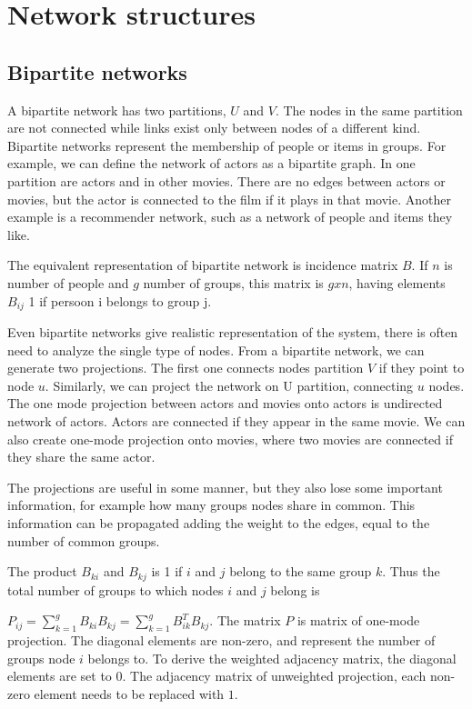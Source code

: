 \section{ Network structures}
\subsection{Bipartite networks}

A bipartite network has two partitions, $U$ and $V$. The nodes in the same partition are not connected while links exist only between nodes of a different kind. Bipartite networks represent the membership of people or items in groups. For example, we can define the network of actors as a bipartite graph. In one partition are actors and in other movies. There are no edges between actors or movies, but the actor is connected to the film if it plays in that movie. Another example is a recommender network, such as a network of people and items they like. 

The equivalent representation of bipartite network is incidence matrix $B$. If $n$ is number of people and $g$ number of groups, this matrix is $g x n$, having elements $B_{ij}$ 1 if persoon i belongs to group j. 

Even bipartite networks give realistic representation of the system, there is often need to analyze the single type of nodes.  From a bipartite network, we can generate two projections. The first one connects nodes partition $V$ if they point to node $u$. Similarly, we can project the network on U partition, connecting $u$ nodes. The one mode projection between actors and movies onto actors is undirected network of actors. Actors are connected if they appear in the same movie. We can also create one-mode projection onto movies, where two movies are connected if they share the same actor.  

The projections are useful in some manner, but they also lose some important information, for example how many groups nodes share in common. This information can be propagated adding the weight to the edges, equal to the number of common groups.

The product $B_{ki}$ and $B_{kj}$ is 1 if $i$ and $j$ belong to the same group $k$. Thus the total number of groups to which nodes $i$ and $j$ belong is 

$P_{ij} = \sum_{k=1}^g B_{ki}B_{kj} = \sum_{k=1}^g B_{ik}^TB_{kj}$. The matrix $P$ is matrix of one-mode projection. The diagonal elements are non-zero, and represent the number of groups node $i$ belongs to.  To derive the weighted adjacency matrix, the diagonal elements are set to 0. The adjacency matrix of unweighted projection, each non-zero element needs to be replaced with $1$. 

